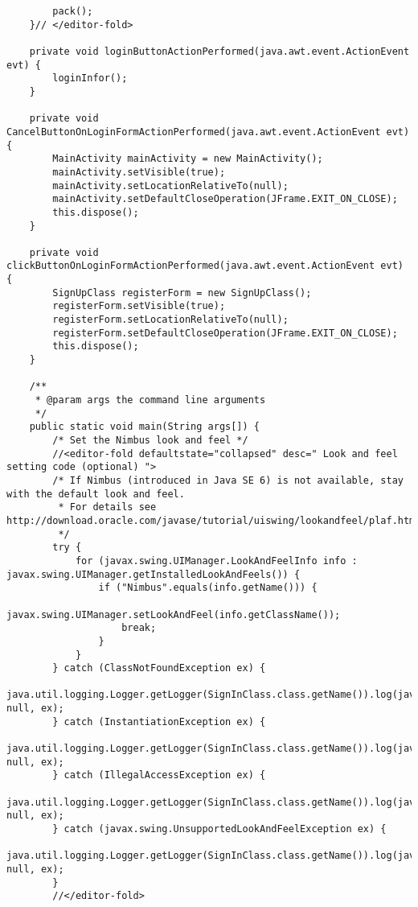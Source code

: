 \documentclass[12pt,a4paper]{article}
\begin{document}
\begin{lstlisting}
        pack();
    }// </editor-fold>                        

    private void loginButtonActionPerformed(java.awt.event.ActionEvent evt) {                                            
        loginInfor();
    }                                           

    private void CancelButtonOnLoginFormActionPerformed(java.awt.event.ActionEvent evt) {                                                        
        MainActivity mainActivity = new MainActivity();
        mainActivity.setVisible(true);
        mainActivity.setLocationRelativeTo(null);
        mainActivity.setDefaultCloseOperation(JFrame.EXIT_ON_CLOSE);
        this.dispose();
    }                                                       

    private void clickButtonOnLoginFormActionPerformed(java.awt.event.ActionEvent evt) {                                                       
        SignUpClass registerForm = new SignUpClass();
        registerForm.setVisible(true);
        registerForm.setLocationRelativeTo(null);
        registerForm.setDefaultCloseOperation(JFrame.EXIT_ON_CLOSE);
        this.dispose();
    }                                                      

    /**
     * @param args the command line arguments
     */
    public static void main(String args[]) {
        /* Set the Nimbus look and feel */
        //<editor-fold defaultstate="collapsed" desc=" Look and feel setting code (optional) ">
        /* If Nimbus (introduced in Java SE 6) is not available, stay with the default look and feel.
         * For details see http://download.oracle.com/javase/tutorial/uiswing/lookandfeel/plaf.html 
         */
        try {
            for (javax.swing.UIManager.LookAndFeelInfo info : javax.swing.UIManager.getInstalledLookAndFeels()) {
                if ("Nimbus".equals(info.getName())) {
                    javax.swing.UIManager.setLookAndFeel(info.getClassName());
                    break;
                }
            }
        } catch (ClassNotFoundException ex) {
            java.util.logging.Logger.getLogger(SignInClass.class.getName()).log(java.util.logging.Level.SEVERE, null, ex);
        } catch (InstantiationException ex) {
            java.util.logging.Logger.getLogger(SignInClass.class.getName()).log(java.util.logging.Level.SEVERE, null, ex);
        } catch (IllegalAccessException ex) {
            java.util.logging.Logger.getLogger(SignInClass.class.getName()).log(java.util.logging.Level.SEVERE, null, ex);
        } catch (javax.swing.UnsupportedLookAndFeelException ex) {
            java.util.logging.Logger.getLogger(SignInClass.class.getName()).log(java.util.logging.Level.SEVERE, null, ex);
        }
        //</editor-fold>


\end{lstlisting}
\end{document}
